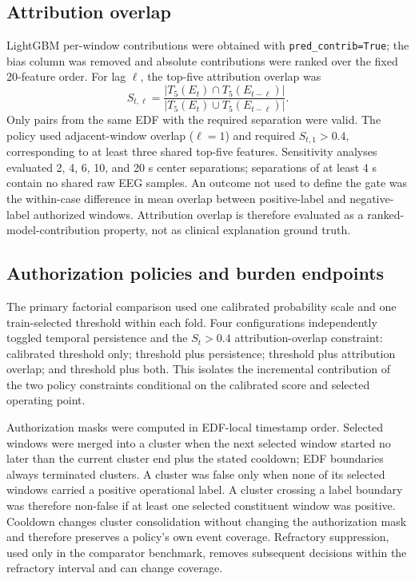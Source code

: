 \documentclass[11pt,a4paper]{article}
\begin{document}
\subsection{Attribution overlap}
\label{sec:attribution}
LightGBM per-window contributions were obtained with \texttt{pred\_contrib=True}; the bias column was removed and absolute contributions were ranked over the fixed 20-feature order. For lag $\ell$, the top-five attribution overlap was
\[
S_{t,\ell}=\frac{|T_5(E_t)\cap T_5(E_{t-\ell})|}{|T_5(E_t)\cup T_5(E_{t-\ell})|}.
\]
Only pairs from the same EDF with the required separation were valid. The policy used adjacent-window overlap ($\ell=1$) and required $S_{t,1}>0.4$, corresponding to at least three shared top-five features. Sensitivity analyses evaluated 2, 4, 6, 10, and 20 s center separations; separations of at least 4 s contain no shared raw EEG samples. An outcome not used to define the gate was the within-case difference in mean overlap between positive-label and negative-label authorized windows. Attribution overlap is therefore evaluated as a ranked-model-contribution property, not as clinical explanation ground truth.

\subsection{Authorization policies and burden endpoints}
\label{sec:endpoints}
The primary factorial comparison used one calibrated probability scale and one train-selected threshold within each fold. Four configurations independently toggled temporal persistence and the $S_t>0.4$ attribution-overlap constraint: calibrated threshold only; threshold plus persistence; threshold plus attribution overlap; and threshold plus both. This isolates the incremental contribution of the two policy constraints conditional on the calibrated score and selected operating point.

Authorization masks were computed in EDF-local timestamp order. Selected windows were merged into a cluster when the next selected window started no later than the current cluster end plus the stated cooldown; EDF boundaries always terminated clusters. A cluster was false only when none of its selected windows carried a positive operational label. A cluster crossing a label boundary was therefore non-false if at least one selected constituent window was positive. Cooldown changes cluster consolidation without changing the authorization mask and therefore preserves a policy's own event coverage. Refractory suppression, used only in the comparator benchmark, removes subsequent decisions within the refractory interval and can change coverage.
\end{document}
